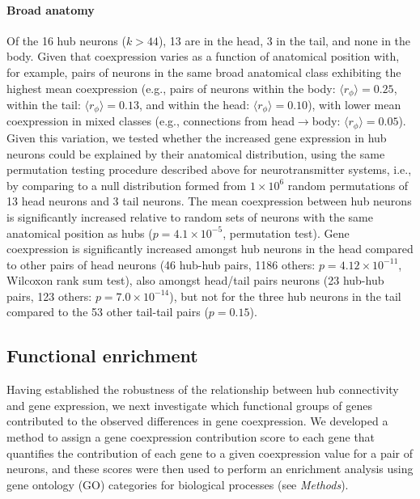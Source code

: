 \documentclass[10pt,letterpaper]{article}
\begin{document}
\paragraph{Broad anatomy}
Of the 16 hub neurons ($k > 44$), 13 are in the head, 3 in the tail, and none in the body.
Given that coexpression varies as a function of anatomical position with, for example, pairs of neurons in the same broad anatomical class exhibiting the highest mean coexpression (e.g., pairs of neurons within the body: $\langle r_\phi\rangle = 0.25$, within the tail: $\langle r_\phi\rangle = 0.13$, and within the head: $\langle r_\phi\rangle = 0.10$), with lower mean coexpression in mixed classes (e.g., connections from head$\rightarrow$body: $\langle r_\phi\rangle = 0.05$).
Given this variation, we tested whether the increased gene expression in hub neurons could be explained by their anatomical distribution, using the same permutation testing procedure described above for neurotransmitter systems, i.e., by comparing to a null distribution formed from $1\times 10^6$ random permutations of 13 head neurons and 3 tail neurons.
The mean coexpression between hub neurons is significantly increased relative to random sets of neurons with the same anatomical position as hubs ($p = 4.1\times 10^{-5}$, permutation test).
Gene coexpression is significantly increased amongst hub neurons in the head compared to other pairs of head neurons (46 hub-hub pairs, 1186 others: $p = 4.12 \times 10^{-11}$, Wilcoxon rank sum test), also amongst head/tail pairs neurons (23 hub-hub pairs, 123 others: $p = 7.0 \times 10^{-14}$), but not for the three hub neurons in the tail compared to the 53 other tail-tail pairs ($p = 0.15$).

\subsection*{Functional enrichment}


Having established the robustness of the relationship between hub connectivity and gene expression, we next investigate which functional groups of genes contributed to the observed differences in gene coexpression.
We developed a method to assign a gene coexpression contribution score to each gene that quantifies the contribution of each gene to a given coexpression value for a pair of neurons, and these scores were then used to perform an enrichment analysis using gene ontology (GO) categories for biological processes \cite{Ashburner2000, Gillis2010} (see \emph{Methods}).
\end{document}
